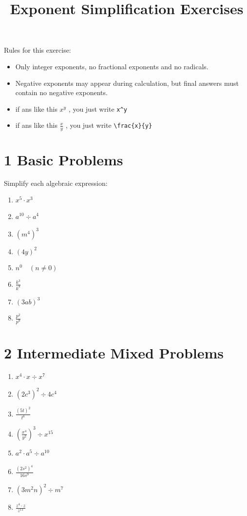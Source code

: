 \documentclass[12pt,a4paper,]{article}
\title{Exponent Simplification Exercises}
\author{}
\date{}
\begin{document}
	\maketitle
	Rules for this exercise:
	\begin{itemize}
		\item Only integer exponents, no fractional exponents and no radicals.
		\item Negative exponents may appear during calculation, but final answers must contain no negative exponents.
		\item if ans like this \(x^{y}\) , you just write \verb|x^y|
		\item if ans like this \(\frac{x}{y}\) , you just write \verb|\frac{x}{y}|
\end{itemize}

\section{1 Basic Problems}
Simplify each algebraic expression:
\begin{enumerate}
	\item \(x^{5} \cdot x^{3}\)
	\item \(a^{10} ÷ a^{4}\)
	\item \(\left(m^{4}\right)^{3}\)
	\item \((4 y)^{2}\)
	\item \(n^{0} \quad(n \neq 0)\)
	\item \(\frac{k^{3}}{k^{8}}\)
	\item \((3 a b)^{3}\)
	\item \(\frac{p^{2}}{p^{9}}\)
\end{enumerate}

\section{2 Intermediate Mixed Problems}
\begin{enumerate}
	\item \(x^{4} \cdot x ÷ x^{7}\)
	\item \(\left(2 c^{3}\right)^{2} ÷ 4 c^{4}\)
	\item \(\frac{(5 t)^{2}}{t^{6}}\)
	\item \(\left(\frac{x^{4}}{y^{2}}\right)^{3} ÷ x^{15}\)
	\item \(a^{2} \cdot a^{5} ÷ a^{10}\)
	\item \(\frac{\left(2 s^{2}\right)^{4}}{16 s^{9}}\)
	\item \(\left(3 m^{2} n\right)^{2} ÷ m^{7}\)
	\item \(\frac{z^{4} \cdot z}{z^{11}}\)
\end{enumerate}
\end{document}
